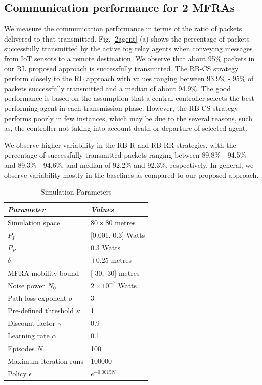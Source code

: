 \documentclass[journal]{IEEEtran}
\begin{document}
\subsection{Communication performance for 2 MFRAs}
We measure the communication performance in terms of the ratio of packets delivered to that transmitted. Fig. \ref{2agent} (a) shows the percentage of packets successfully transmitted by the active fog relay agents when conveying messages from IoT sensors to a remote destination. We observe that about 95\% packets in our RL proposed approach is successfully transmitted. The RB-CS strategy perform closely to the RL approach with values ranging between 93.9\% - 95\% of packets successfully transmitted and a median of about 94.9\%. The good performance is based on the assumption that a central controller selects the best performing agent in each transmission phase. However, the RB-CS strategy performs poorly in few instances, which may be due to the several reasons, such as, the controller not taking into account death or departure of selected agent.

We observe higher variability in the RB-R and RB-RR strategies, with the percentage of successfully transmitted packets ranging between 89.8\% - 94.5\% and 89.3\% - 94.6\%, and median of 92.2\% and 92.3\%, respectively. In general, we observe variability mostly in the baselines as compared to our proposed approach.

\begin{table}
\small
\centering
\caption{Simulation Parameters}
\label{table:simparameters}
\begin{tabular}{ll}
  \hline
 \textit{Parameter} & \textit{Values} \\
  \hline \hline
    Simulation space & $80 \times 80$ metres\\
   $P_{I}$ & [0.001, 0.3] Watts \\
   $P_{R}$ & 0.3 Watts\\
   $\delta$ & $\pm0.25$ metres\\
   MFRA mobility bound & [-30,~30] metres\\
   Noise power $N_0$ & $2 \times 10^{-7}$ Watts\\
   Path-loss exponent $\sigma$ & 3\\
   Pre-defined threshold $\kappa$ & 1\\
   Discount factor $\gamma$ & 0.9\\
   Learning rate $\alpha$ & 0.1\\
   Episodes $N$ & 100\\
   Maximum iteration runs & 100000\\
   Policy $\epsilon$ & $e^{-0.0015N}$\\

   \hline \hline
 \end{tabular}
 \end{table}
\end{document}
